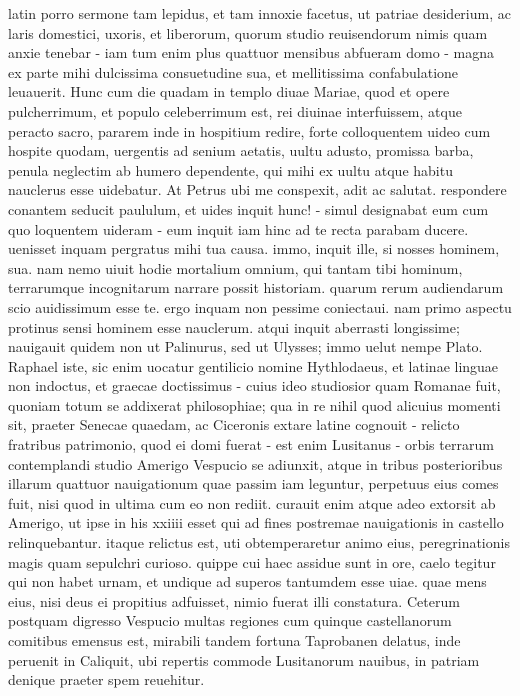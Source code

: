 \documentclass[12pt,a4paper]{book}
\renewenvironment{latin}
    	{\begin{hyphenrules}{latin}}
    	{\end{hyphenrules}}
\begin{document}
\begin{pages}
\begin{Leftside}
\begin{latin}
porro sermone tam lepidus, et tam innoxie facetus, ut patriae desiderium, ac 
laris domestici, uxoris, et liberorum, quorum studio reuisendorum nimis quam 
anxie tenebar - iam tum enim plus quattuor mensibus abfueram domo - magna ex 
parte mihi dulcissima consuetudine sua, et mellitissima confabulatione 
leuauerit. 
\pend
\pstart
Hunc cum die quadam in templo diuae Mariae, quod et opere pulcherrimum, et 
populo celeberrimum est, rei diuinae interfuissem, atque peracto sacro, pararem 
inde in hospitium redire, forte colloquentem uideo cum hospite quodam, uergentis 
ad senium aetatis, uultu adusto, promissa barba, penula neglectim ab humero 
dependente, qui mihi ex uultu atque habitu nauclerus esse uidebatur. 
At Petrus ubi me conspexit, adit ac salutat. respondere conantem seducit 
paululum, et uides inquit hunc! - simul designabat eum cum quo loquentem uideram 
- eum inquit iam hinc ad te recta parabam ducere. uenisset inquam pergratus mihi 
tua causa. immo, inquit ille, si nosses hominem, sua. nam nemo uiuit hodie 
mortalium omnium, qui tantam tibi hominum, terrarumque incognitarum narrare 
possit historiam. quarum rerum audiendarum scio auidissimum esse te. ergo inquam 
non pessime coniectaui. nam primo aspectu protinus sensi hominem esse nauclerum. 
atqui inquit aberrasti longissime; nauigauit quidem non ut Palinurus, sed ut 
Ulysses; immo uelut nempe Plato. 
\pend
\pstart
Raphael iste, sic enim uocatur gentilicio 
nomine Hythlodaeus, et latinae linguae non indoctus, et graecae doctissimus - 
cuius ideo studiosior quam Romanae fuit, quoniam totum se addixerat 
philosophiae; qua in re nihil quod alicuius momenti sit, praeter Senecae 
quaedam, ac Ciceronis extare latine cognouit - relicto fratribus patrimonio, 
quod ei domi fuerat - est enim Lusitanus - orbis terrarum contemplandi studio 
Amerigo Vespucio se adiunxit, atque in tribus posterioribus illarum quattuor 
nauigationum quae passim iam leguntur, perpetuus eius comes fuit, nisi quod in 
ultima cum eo non rediit. curauit enim atque adeo extorsit ab Amerigo, ut ipse 
in his xxiiii esset qui ad fines postremae nauigationis in castello 
relinquebantur. itaque relictus est, uti obtemperaretur animo eius, 
peregrinationis magis quam sepulchri curioso. quippe cui haec assidue sunt in 
ore, caelo tegitur qui non habet urnam, et undique ad superos tantumdem esse 
uiae. quae mens eius, nisi deus ei propitius adfuisset, nimio fuerat illi 
constatura. 
\pend
\pstart
Ceterum postquam digresso Vespucio multas regiones cum quinque castellanorum 
comitibus emensus est, mirabili tandem fortuna Taprobanen delatus, inde peruenit 
in Caliquit, ubi repertis commode Lusitanorum nauibus, in patriam denique 
praeter spem reuehitur. 
\pend
\endnumbering
    \end{latin}
    \end{Leftside}


\end{pages}
\end{document}
